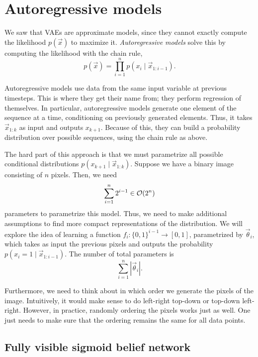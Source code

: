 \section{Autoregressive models}

We saw that VAEs are approximate models, since they cannot exactly compute the likelihood
$p(\vec{x})$ to maximize it. \textit{Autoregressive models} solve this by computing the likelihood
with the chain rule, \[
    p(\vec{x}) = \prod_{i=1}^{n} p(x_i\mid \vec{x}_{1:i-1}).
\]

Autoregressive models use data from the same input variable at previous timesteps. This is where
they get their name from; they perform regression of themselves. In particular, autoregressive
models generate one element of the sequence at a time, conditioning on previously generated
elements. Thus, it takes $\vec{x}_{1:k}$ as input and outputs $x_{k+1}$. Because of this, they can
build a probability distribution over possible sequences, using the chain rule as above.

The hard part of this approach is that we must parametrize all possible conditional distributions
$p(x_{k+1} \mid \vec{x}_{1:k})$. Suppose we have a binary image consisting of $n$ pixels. Then, we
need \[
    \sum_{i=1}^{n} 2^{i-1} \in \bigo{2^n}
\]
parameters to parametrize this model. Thus, we need to make additional assumptions to find more
compact representations of the distribution. We will explore the idea of learning a function
$f_i: \{ 0,1 \}^{i-1} \to [0,1]$, parametrized by $\vec{\theta}_i$, which takes as input the
previous pixels and outputs the probability $p(x_i = 1 \mid \vec{x}_{1:i-1})$. The number of total
parameters is \[
    \sum_{i=1}^{n} |\vec{\theta}_i|.
\]

Furthermore, we need to think about in which order we generate the pixels of the image.
Intuitively, it would make sense to do left-right top-down or top-down left-right. However, in
practice, randomly ordering the pixels works just as well. One just needs to make sure that the
ordering remains the same for all data points.

\subsection{Fully visible sigmoid belief network}

